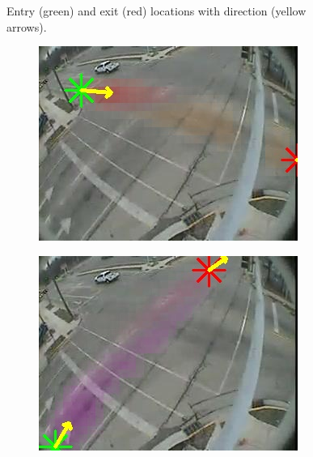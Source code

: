 \begin{figure}
\begin{subfigure}{0.32\linewidth}
        \end{subfigure}
        \caption{Entry (green) and exit (red) locations with direction (yellow arrows).}
        \label{fig:entry-exit-full-2}
\end{figure}
\begin{figure}
    \centering
        \begin{subfigure}{0.32\linewidth}
            \includegraphics[width=\linewidth]{./img/scene_learning/res/intersection_4/intersection_4-0.jpg}
        \end{subfigure}
        \begin{subfigure}{0.32\linewidth}
            \includegraphics[width=\linewidth]{./img/scene_learning/res/intersection_4/intersection_4-1.jpg}

\end{subfigure}
\end{figure}
